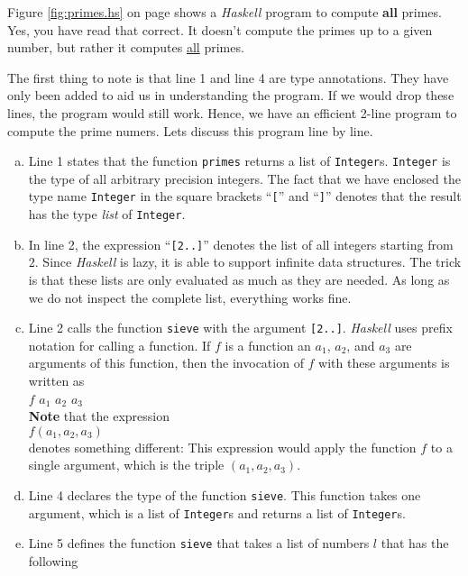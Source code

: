 Figure \ref{fig:primes.hs} on page \pageref{fig:primes.hs} shows a \textsl{Haskell} program to compute \textbf{all}
primes.  Yes, you have read that correct.  It doesn't compute the primes up to a given number, but rather it
computes \underline{all} primes.

The first thing to note is that line 1 and line 4 are type annotations.  They have only
been added to aid us in understanding the program.  If we would drop these lines, the program would still
work.  Hence, we have an efficient 2-line program to compute the prime numers.  Lets discuss this program line
by line. 
\begin{enumerate}[(a)]
\item Line 1 states that the function \texttt{primes} returns a list of \texttt{Integer}s.
  \texttt{Integer} is the type of all arbitrary precision integers.  The fact that we have enclosed
  the type name \texttt{Integer} in the square brackets ``\texttt{[}'' and ``\texttt{]}'' denotes that the
  result has the type \textsl{list} of \texttt{Integer}.
\item In line 2, the expression ``\texttt{[2..]}''  denotes the list of all integers starting from $2$.  Since
  \textsl{Haskell} is lazy, it is able to support infinite data structures.  The trick is that these lists are
  only evaluated as much as they are needed.  As long as we do not inspect the complete list, everything works
  fine. 
\item Line 2 calls the function \texttt{sieve} with the argument \texttt{[2..]}.  \textsl{Haskell} uses prefix
  notation for calling a function.  If $f$ is a function an $a_1$, $a_2$, and $a_3$ are arguments of this
  function, then the invocation of $f$ with these arguments is written as
  \\[0.2cm]
  \hspace*{1.3cm}
  $f$ $a_1$ $a_2$ $a_3$
  \\[0.2cm]
  \textbf{Note} that the expression
  \\[0.2cm]
  \hspace*{1.3cm}
  $f(a_1, a_2, a_3)$
  \\[0.2cm]
  denotes something different:  This expression would apply the function $f$ to a single argument, which is the
  triple $(a_1, a_2, a_3)$.
\item Line 4 declares the type of the function \texttt{sieve}.  This function takes one argument, which is a
  list of \texttt{Integer}s and returns a list of \texttt{Integer}s.
\item Line 5 defines the function \texttt{sieve} that takes a list of numbers $l$ that has the following

\end{enumerate}
